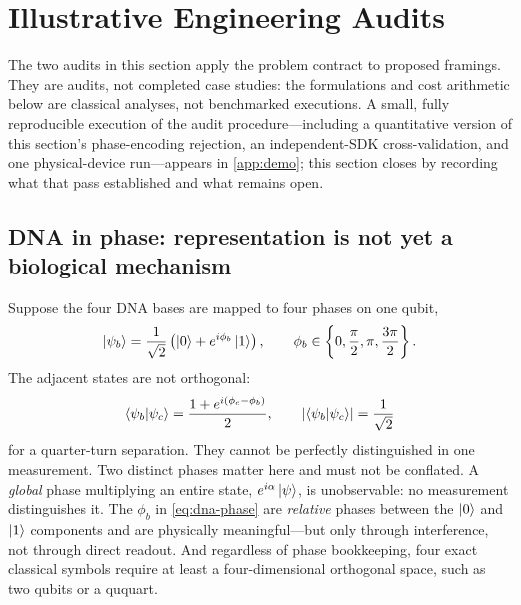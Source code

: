\section{Illustrative Engineering Audits}\label{sec:audits}

The two audits in this section apply the problem contract to proposed framings. They are audits, not completed case studies: the formulations and cost arithmetic below are classical analyses, not benchmarked executions. A small, fully reproducible execution of the audit procedure---including a quantitative version of this section's phase-encoding rejection, an independent-SDK cross-validation, and one physical-device run---appears in \cref{app:demo}; this section closes by recording what that pass established and what remains open.

\subsection{DNA in phase: representation is not yet a biological mechanism}

Suppose the four DNA bases are mapped to four phases on one qubit,
\begin{equation}
\left|\psi_b\right\rangle=\frac{1}{\sqrt{2}}
\left(\left|0\right\rangle+e^{i\phi_b}\left|1\right\rangle\right),
\qquad
\phi_b\in\left\{0,\frac{\pi}{2},\pi,\frac{3\pi}{2}\right\}.
\label{eq:dna-phase}
\end{equation}
The adjacent states are not orthogonal:
\begin{equation}
\left\langle\psi_b\middle|\psi_c\right\rangle
=\frac{1+e^{i(\phi_c-\phi_b)}}{2},
\qquad
\left|\left\langle\psi_b\middle|\psi_c\right\rangle\right|=\frac{1}{\sqrt{2}}
\end{equation}
for a quarter-turn separation. They cannot be perfectly distinguished in one measurement. Two distinct phases matter here and must not be conflated. A \emph{global} phase multiplying an entire state, $e^{i\alpha}\left|\psi\right\rangle$, is unobservable: no measurement distinguishes it. The $\phi_b$ in \cref{eq:dna-phase} are \emph{relative} phases between the $\left|0\right\rangle$ and $\left|1\right\rangle$ components and are physically meaningful---but only through interference, not through direct readout. And regardless of phase bookkeeping, four exact classical symbols require at least a four-dimensional orthogonal space, such as two qubits or a ququart.

